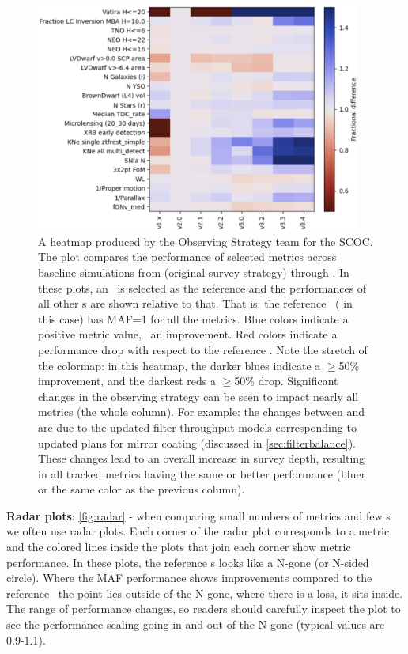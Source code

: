 \begin{figure}
  \centering
    \includegraphics[width=0.95\textwidth]{figures/v1-v34heatmap.png}
\caption{A heatmap produced by the Observing Strategy team for the SCOC. The plot compares the performance of selected metrics across baseline simulations from  (original survey strategy) through . In these plots, an \opsim\ is selected as the reference and the performances of all other \opsim s are shown relative to that. That is: the reference \opsim\ ( in this case) has MAF=1 for all the metrics. Blue colors indicate a positive metric value, \ie\ an improvement. Red colors indicate a performance drop with respect to the reference \opsim. Note the stretch of the colormap: in this heatmap, the darker blues indicate a \mbox{$\geq$50\%} improvement, and the darkest reds a \mbox{$\geq$50\%} drop. Significant changes in the observing strategy can be seen to impact nearly all metrics (the whole column). For example: the changes between  and  are due to the updated filter throughput models corresponding to updated plans for mirror coating (discussed in \autoref{sec:filterbalance}). These changes lead to an overall increase in survey depth, resulting in all tracked metrics having the same or better performance (bluer or the same color as the previous column).}
\label{fig:heatmap}
\end{figure}


\FloatBarrier

{\bf Radar plots}: \autoref{fig:radar} - when comparing small numbers of metrics and few \opsim s we often use radar plots. Each corner of the radar plot corresponds to a metric, and the colored lines inside the plots that join each corner show metric performance. In these plots, the reference \opsim s looks like a N-gone (or N-sided circle). Where the MAF performance shows improvements compared to the reference \opsim\ the point lies outside of the N-gone, where there is a loss, it sits inside. The range of performance changes, so readers should carefully inspect the plot to see the performance scaling going in and out of the N-gone (typical values are 0.9-1.1).

